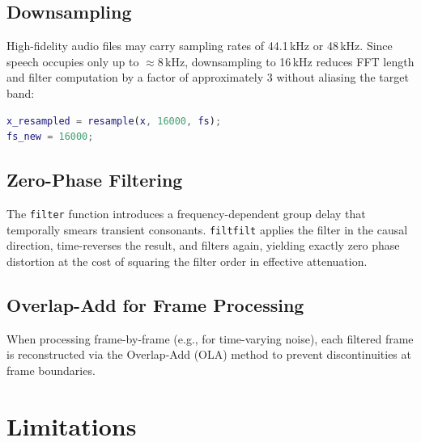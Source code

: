 \documentclass[conference]{IEEEtran}
\begin{document}
\subsection{Downsampling}
High-fidelity audio files may carry sampling rates of 44.1\,kHz or 48\,kHz.
Since speech occupies only up to $\approx 8$\,kHz, downsampling to 16\,kHz
reduces FFT length and filter computation by a factor of approximately 3
without aliasing the target band:

\begin{lstlisting}[language=Matlab, caption={Polyphase resampling to 16 kHz.}]
x_resampled = resample(x, 16000, fs);
fs_new = 16000;
\end{lstlisting}

\subsection{Zero-Phase Filtering}
The \texttt{filter} function introduces a frequency-dependent group delay that
temporally smears transient consonants. \texttt{filtfilt} applies the filter
in the causal direction, time-reverses the result, and filters again,
yielding exactly zero phase distortion at the cost of squaring the filter
order in effective attenuation.

\subsection{Overlap-Add for Frame Processing}
When processing frame-by-frame (e.g., for time-varying noise), each filtered
frame is reconstructed via the Overlap-Add (OLA) method to prevent
discontinuities at frame boundaries.

\section{Limitations}
\end{document}
